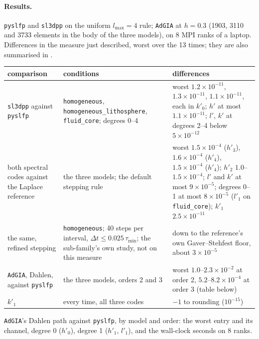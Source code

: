 \documentclass[11pt]{article}
\numberwithin{equation}{section}
\newcommand{\code}[1]{\texttt{#1}}
\begin{document}
\paragraph{Results.} \code{pyslfp} and \code{sl3dpp} on the uniform
$l_{\max}=4$ rule; \code{AdGIA} at $h=0.3$ (1903, 3110 and 3733 elements in
the body of the three models), on 8 MPI ranks of a laptop. Differences in
the measure just described, worst over the 13 times; they are also
summarised in .
\begin{center}
\small
\begin{tabular}{@{}P{3.9cm}P{4.4cm}P{6.9cm}@{}}
\toprule
comparison & conditions & differences \\
\midrule
\code{sl3dpp} against \code{pyslfp} & \code{homogeneous},
\code{homogeneous\_lithosphere}, \code{fluid\_core}; degrees 0--4 & worst
$1.2\times10^{-11}$, $1.3\times10^{-11}$, $1.1\times10^{-11}$, each in
$k'_0$; $h'$ at most $1.1\times10^{-11}$; $l'$, $k'$ at degrees 2--4 below
$5\times10^{-12}$ \\ \addlinespace
both spectral codes against the Laplace reference & the three models; the
default stepping rule & worst $1.5\times10^{-4}$ ($h'_3$),
$1.6\times10^{-4}$ ($h'_4$), $1.5\times10^{-4}$ ($h'_4$); $h'_2$
$1.0$--$1.5\times10^{-4}$; $l'$ and $k'$ at most $9\times10^{-5}$; degrees
0--1 at most $8\times10^{-5}$ ($l'_1$ on \code{fluid\_core}); $k'_1$
$2.5\times10^{-11}$ \\ \addlinespace
the same, refined stepping & \code{homogeneous}; 40 steps per interval,
$\Delta t\le0.025\,\tau_{\min}$; the sub-family's own study, not on
this measure & down to the reference's own Gaver--Stehfest floor, about
$3\times10^{-5}$ \\ \addlinespace
\code{AdGIA}, Dahlen, against \code{pyslfp} & the three models, orders 2
and 3 & worst $1.0$--$2.3\times10^{-2}$ at order 2,
$5.2$--$8.2\times10^{-4}$ at order 3 (table below) \\ \addlinespace
$k'_1$ & every time, all three codes & $-1$ to rounding ($10^{-15}$) \\
\bottomrule
\end{tabular}
\end{center}
\noindent \code{AdGIA}'s Dahlen path against \code{pyslfp}, by model and
order: the worst entry and its channel, degree 0 ($h'_0$), degree 1
($h'_1$, $l'_1$), and the wall-clock seconds on 8 ranks.
\end{document}
